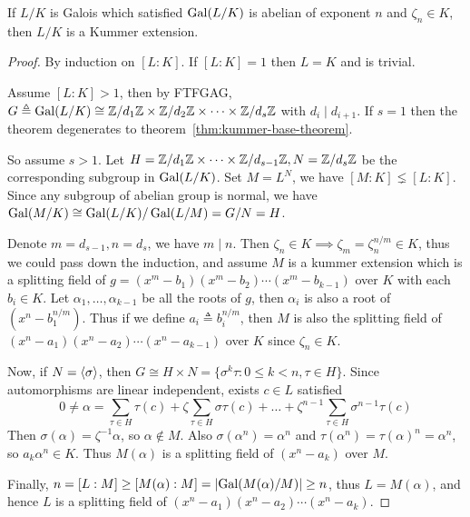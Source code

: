 \begin{theorem}
  If $L/K$ is Galois which satisfied $\operatorname{Gal}(L/K)$ is abelian of exponent $n$ and $\zeta_n \in K$,
  then $L/K$ is a Kummer extension.

  \begin{proof}
    By induction on $[L: K]$. If $[L: K] = 1$ then $L = K$ and is trivial.

    Assume $[L: K] > 1$, then by FTFGAG, $G \triangleq \operatorname{Gal}(L/K) \cong {\mathbb{Z}}/{d_1 \mathbb{Z}}
    \times {\mathbb{Z}}/{d_2 \mathbb{Z}} \times \dots \times {\mathbb{Z}}/{d_s \mathbb{Z}}$ with $d_i \mid d_{i+1}$.
    If $s = 1$ then the theorem degenerates to theorem~\ref{thm:kummer-base-theorem}.

    So assume $s > 1$. Let $H = \mathbb{Z} / d_1 \mathbb{Z} \times \dots \times \mathbb{Z} / d_{s-1} \mathbb{Z},
    N = \mathbb{Z} / d_s \mathbb{Z}$ be the corresponding subgroup in $\operatorname{Gal}(L/K)$.
    Set $M = L^N$, we have $[M: K] \lneq [L: K]$. Since any subgroup
    of abelian group is normal, we have $\operatorname{Gal}(M/K) \cong \operatorname{Gal}(L/K) / \operatorname{Gal}(L/M) = G / N = H$.

    Denote $m = d_{s-1}, n = d_{s}$, we have $m \mid n$.
    Then $\zeta_n \in K \implies \zeta_m = \zeta_n^{n/m} \in K$,
    thus we could pass down the induction, and assume $M$ is a kummer extension which is a splitting
    field of $g = (x^m - b_1) (x^m - b_2) \dotsm (x^m - b_{k-1})$ over $K$ with each $b_i \in K$.
    Let $\alpha_1, \dots, \alpha_{k-1}$ be all the roots of $g$, then $\alpha_i$
    is also a root of $(x^n - b_1^{n/m})$. Thus if we define $a_i \triangleq b_i^{n/m}$, then
    $M$ is also the splitting field of $(x^n - a_1) (x^n - a_2) \dotsm (x^n - a_{k-1})$ over $K$
    since $\zeta_n \in K$.

    Now, if $N = \langle\sigma\rangle$, then $G \cong H \times N = \{\sigma^k \tau : 0 \leq k < n, \tau \in H\}$.
    Since automorphisms are linear independent, exists $c \in L$ satisfied
    \[ 0 \neq \alpha = \sum_{\tau \in H} \tau(c) + \zeta \sum_{\tau \in H} \sigma \tau(c)
    + \dots + \zeta^{n-1} \sum_{\tau \in H} \sigma^{n-1} \tau(c) \]
    Then $\sigma(\alpha) = \zeta^{-1} \alpha$, so $\alpha \not\in M$. Also $\sigma(\alpha^n) = \alpha^n$
    and $\tau(\alpha^n) = \tau(\alpha)^n = \alpha^n$, so $a_k \alpha^n \in K$.
    Thus $M(\alpha)$ is a splitting field of $(x^n - a_k)$ over $M$.

    Finally, $n = [L: M] \geq [M(\alpha): M] = \lvert\operatorname{Gal}(M(\alpha) / M)\rvert \geq n$,
    thus $L = M(\alpha)$, and hence $L$ is a splitting field of
    $(x^n - a_1) (x^n - a_2) \dotsm (x^n - a_k)$.
  \end{proof}
\end{theorem}

